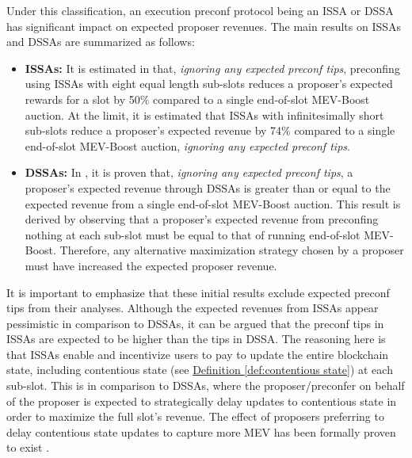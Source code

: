 \documentclass[a4paper]{article}
\theoremstyle{boldstyle}
\newcommand{\todoks}[1]{\todo[color=purple!40]{\textbf{Katerina:} #1}}
\begin{document}
   Under this classification, an execution preconf protocol being an ISSA or DSSA has significant impact on expected proposer revenues. The main results on ISSAs and DSSAs are summarized as follows: 
    

    \begin{itemize}
        \item \textbf{ISSAs:} It is estimated in \cite{W:EstimatingtheRevenuefromIndependentSub-SlotAuctionPreconfirmations} that, \textit{ignoring any expected preconf tips}, preconfing using ISSAs with eight equal length sub-slots reduces a proposer's expected rewards for a slot by 50\% compared to a single end-of-slot MEV-Boost auction. At the limit, it is estimated that ISSAs with infinitesimally short sub-slots reduce a proposer's expected revenue by 74\% compared to a single end-of-slot MEV-Boost auction, \textit{ignoring any expected preconf tips}.

        \item \textbf{DSSAs:} In \cite{W:AnalysingExpectedProposerRevenuefromPreconfirmations}, it is proven that, \textit{ignoring any expected preconf tips}, a proposer's expected revenue through DSSAs is greater than or equal to the expected revenue from a single end-of-slot MEV-Boost auction. This result is derived by observing that a proposer's expected revenue from preconfing nothing at each sub-slot must be equal to that of running end-of-slot MEV-Boost. Therefore, any alternative maximization strategy chosen by 
        a proposer must have increased the expected proposer revenue. 
    \end{itemize}


    It is important to emphasize that these initial results exclude expected preconf tips from their analyses. Although the expected revenues from ISSAs appear pessimistic in comparison to DSSAs, it can be argued that the preconf tips in ISSAs are expected to be higher than the tips in DSSA\cite{W:AnalysingExpectedProposerRevenuefromPreconfirmations}. The reasoning here is that ISSAs enable and incentivize users to pay to update the entire blockchain state, including contentious state (see \hyperref[def:contentious state]{Definition \ref{def:contentious state}}) at each sub-slot. This is in comparison to DSSAs, where the proposer/preconfer on behalf of the proposer is expected to strategically delay updates to contentious state in order to maximize the full slot's revenue. The effect of proposers preferring to delay contentious state updates to capture more MEV has been formally proven to exist \cite{LVRwithFees}.
\end{document}
